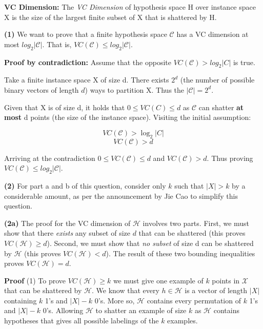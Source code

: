 \documentclass[11pt]{article}
\renewcommand\part[1]{\vspace{.10in}\textbf{(#1)}}
\begin{document}
\textbf{VC Dimension:} The \textit{VC Dimension} of hypothesis space H over instance space X is the size of the largest finite subset of X that is shattered by H.

\part{1} We want to prove that a finite hypothesis space $\mathcal{C}$ has a VC dimension at most $log_2|\mathcal{C}|$. That is, $VC(\mathcal{C}) \leq log_2|\mathcal{C}|$.

\textbf{Proof by contradiction:} Assume that the opposite $VC(\mathcal{C}) > log_2|C|$ is true.

Take a finite instance space X of size d. There exists $2^d$ (the number of possible binary vectors of length $d$) ways to partition X. Thus the  $\mathcal{|C|} = 2^d$.

Given that X is of size d, it holds that $0 \leq VC(C) \leq d$ as $\mathcal{C}$ can shatter \textbf{at most} d points (the size of the instance space). Visiting the initial assumption:

$$VC(\mathcal{C}) > \log_2|C|$$
$$VC(\mathcal{C}) > d$$

Arriving at the contradiction $0 \leq VC(\mathcal{C}) \leq d$ and $VC(\mathcal{C}) > d$. Thus proving $VC(\mathcal{C}) \leq log_2|\mathcal{C}|$.

\part{2} For part a and b of this question, consider only $k$ such that $|X| > k$ by a considerable amount, as per the announcement by Jie Cao to simplify this question. 

\part{2a} The proof for the VC dimension of $\mathcal{H}$ involves two parts. First, we must show that there \textit{exists} any subset of size $d$ that can be shattered (this proves $VC(\mathcal{H}) \geq d$). Second, we must show that \textit{no subset} of size d can be shattered by $\mathcal{H}$ (this proves $VC(\mathcal{H}) < d$). The result of these two bounding inequalities proves $VC(\mathcal{H}) = d$.

\textbf{Proof} (1) To prove $VC(\mathcal{H}) \geq k$ we must give one example of $k$ points in $\mathcal{X}$ that can be shattered by $\mathcal{H}$. We know that every $h \in \mathcal{H}$ is a vector of length $|X|$ containing $k$ 1's and $|X| - k$ 0's. More so, $\mathcal{H}$ contains every permutation of $k$ 1's and $|X| - k$ 0's. Allowing $\mathcal{H}$ to shatter an example of size $k$ as $\mathcal{H}$ contains hypotheses that gives all possible labelings of the $k$ examples.
\end{document}
